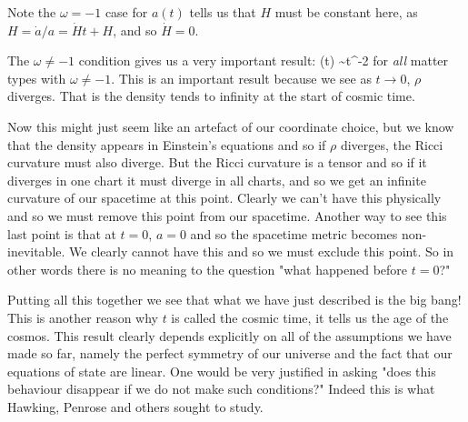 \br 
    Note the $\omega=-1$ case for $a(t)$ tells us that $H$ must be constant here, as $H = \dot{a}/a = \dot{H}t + H$, and so $\dot{H}=0$.
\er 

The $\omega\neq-1$ condition gives us a very important result: 
\bse 
    \rho(t) \sim t^{-2}
\ese 
for \textit{all} matter types with $\omega\neq-1$. This is an important result because we see as $t\to 0$, $\rho$ diverges. That is the density tends to infinity at the start of cosmic time.

Now this might just seem like an artefact of our coordinate choice, but we know that the density appears in Einstein's equations and so if $\rho$ diverges, the Ricci curvature must also diverge. But the Ricci curvature is a tensor and so if it diverges in one chart it must diverge in all charts, and so we get an infinite curvature of our spacetime at this point. Clearly we can't have this physically and so we must remove this point from our spacetime. Another way to see this last point is that at $t=0$, $a=0$ and so the spacetime metric becomes non-inevitable. We clearly cannot have this and so we must exclude this point. So in other words there is no meaning to the question "what happened before $t=0$?"

Putting all this together we see that what we have just described is the big bang! This is another reason why $t$ is called the cosmic time, it tells us the age of the cosmos. This result clearly depends explicitly on all of the assumptions we have made so far, namely the perfect symmetry of our universe and the fact that our equations of state are linear. One would be very justified in asking "does this behaviour disappear if we do not make such conditions?" Indeed this is what Hawking, Penrose and others sought to study. 